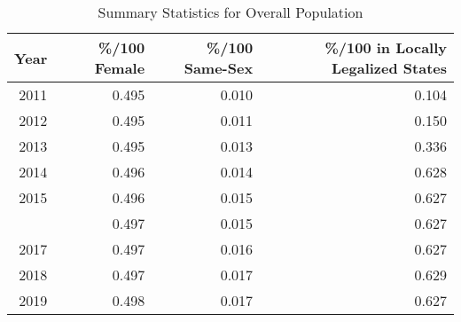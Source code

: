 \begin{table}

\caption{Summary Statistics for Overall Population}
\centering
\begin{tabular}[t]{rrrr}
\toprule
Year & \%/100 Female & \%/100 Same-Sex & \%/100 in Locally Legalized States\\
\midrule
2011 & 0.495 & 0.010 & 0.104\\
2012 & 0.495 & 0.011 & 0.150\\
2013 & 0.495 & 0.013 & 0.336\\
2014 & 0.496 & 0.014 & 0.628\\
2015 & 0.496 & 0.015 & 0.627\\
\addlinespace
2016 & 0.497 & 0.015 & 0.627\\
2017 & 0.497 & 0.016 & 0.627\\
2018 & 0.497 & 0.017 & 0.629\\
2019 & 0.498 & 0.017 & 0.627\\
\bottomrule
\end{tabular}
\end{table}
